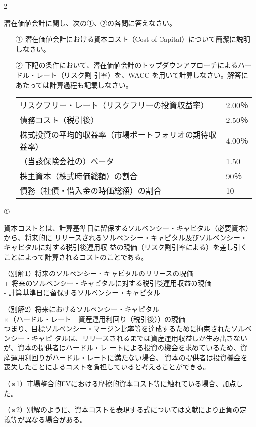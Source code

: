 2\documentclass[report,gutter=10mm,fore-edge=10mm,uplatex,dvipdfmx]{jlreq}
\begin{document}
潜在価値会計に関し、次の①、②の各問に答えなさい。

\begin{itemize}
\item[①] 潜在価値会計における資本コスト（Cost of Capital）について簡潔に説明しなさい。
\item[②] 下記の条件において、潜在価値会計のトップダウンアプローチによるハードル・レート（リスク割 引率）を、WACC を用いて計算しなさい。解答にあたっては計算過程も記載しなさい。
\begin{tabular}{ll}
リスクフリー・レート（リスクフリーの投資収益率）&2.00％  \\
 債務コスト（税引後）&2.50％\\
 株式投資の平均的収益率（市場ポートフォリオの期待収益率） &4.00％\\
 （当該保険会社の）ベータ&1.50\\
 株主資本（株式時価総額）の割合&90％\\
 債務（社債・借入金の時価総額）の割合&10%
\end{tabular} 
\end{itemize}
\answer{}
①

資本コストとは、計算基準日に留保するソルベンシー・キャピタル（必要資本）から、将来的に
リリースされるソルベンシー・キャピタル及びソルベンシー・キャピタルに対する税引後運用収
益の現価（リスク割引率による）を差し引くことによって計算されるコストのことである。

（別解1）将来のソルベンシー・キャピタルのリリースの現価\\
+ 将来のソルベンシー・キャピタルに対する税引後運用収益の現価\\
- 計算基準日に留保するソルベンシー・キャピタル

（別解2）将来におけるソルベンシー・キャピタル\\
×（ハードル・レート - 資産運用利回り（税引後））の現価\\

つまり、目標ソルベンシー・マージン比率等を達成するために拘束されたソルベンシー・キャピ
タルは、リリースされるまでは資産運用収益しか生み出さないが、資本の提供者はハードル・レ
ートによる投資の機会を求めているため、資産運用利回りがハードル・レートに満たない場合、
資本の提供者は投資機会を喪失したことによるコストを負担していると考えることができる。

（※1）市場整合的EVにおける摩擦的資本コスト等に触れている場合、加点した。

（※2）別解のように、資本コストを表現する式については文献により正負の定義等が異なる場合がある。
\end{document}
